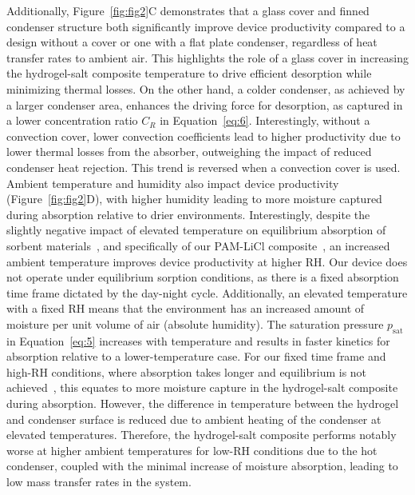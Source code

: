 \documentclass[11pt]{article}
\begin{document}
Additionally, Figure~\ref{fig:fig2}C demonstrates that a glass cover and finned condenser structure both significantly improve device productivity compared to a design without a cover or one with a flat plate condenser, regardless of heat transfer rates to ambient air. This highlights the role of a glass cover in increasing the hydrogel-salt composite temperature to drive efficient desorption while minimizing thermal losses. On the other hand, a colder condenser, as achieved by a larger condenser area, enhances the driving force for desorption, as captured in a lower concentration ratio $C_R$ in Equation~\ref{eq:6}. Interestingly, without a convection cover, lower convection coefficients lead to higher productivity due to lower thermal losses from the absorber, outweighing the impact of reduced condenser heat rejection. This trend is reversed when a convection cover is used. Ambient temperature and humidity also impact device productivity (Figure~\ref{fig:fig2}D), with higher humidity leading to more moisture captured during absorption relative to drier environments. Interestingly, despite the slightly negative impact of elevated temperature on equilibrium absorption of sorbent materials~\cite{liu2023}, and specifically of our PAM-LiCl composite~\cite{diazmarin2022c}, an increased ambient temperature improves device productivity at higher RH. Our device does not operate under equilibrium sorption conditions, as there is a fixed absorption time frame dictated by the day-night cycle. Additionally, an elevated temperature with a fixed RH means that the environment has an increased amount of moisture per unit volume of air (absolute humidity). The saturation pressure $p_{\mathrm{sat}}$ in Equation~\ref{eq:5} increases with temperature and results in faster kinetics for absorption relative to a lower-temperature case. For our fixed time frame and high-RH conditions, where absorption takes longer and equilibrium is not achieved~\cite{diazmarin2024b}, this equates to more moisture capture in the hydrogel-salt composite during absorption. However, the difference in temperature between the hydrogel and condenser surface is reduced due to ambient heating of the condenser at elevated temperatures. Therefore, the hydrogel-salt composite performs notably worse at higher ambient temperatures for low-RH conditions due to the hot condenser, coupled with the minimal increase of moisture absorption, leading to low mass transfer rates in the system.
\end{document}
